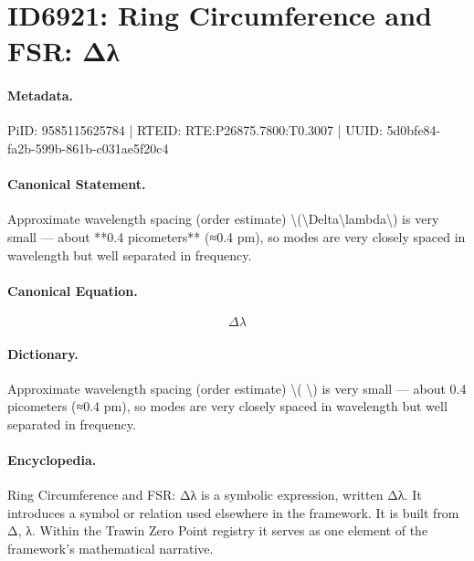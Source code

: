 \section*{ID6921: Ring Circumference and FSR: Δλ}
\paragraph{Metadata.}
PiID: 9585115625784 | RTEID: RTE:P26875.7800:T0.3007 | UUID: 5d0bfe84-fa2b-599b-861b-c031ae5f20c4

\paragraph{Canonical Statement.}
Approximate wavelength spacing (order estimate) \textbackslash{}(\textbackslash{}Delta\textbackslash{}lambda\textbackslash{}) is very small — about **0.4 picometers** (≈0.4 pm), so modes are very closely spaced in wavelength but well separated in frequency.

\paragraph{Canonical Equation.}
\[
\Delta\lambda
\]

\paragraph{Dictionary.}
Approximate wavelength spacing (order estimate) \textbackslash{}( \textbackslash{}) is very small — about 0.4 picometers (≈0.4 pm), so modes are very closely spaced in wavelength but well separated in frequency.

\paragraph{Encyclopedia.}
Ring Circumference and FSR: Δλ is a symbolic expression, written Δλ. It introduces a symbol or relation used elsewhere in the framework. It is built from Δ, λ. Within the Trawin Zero Point registry it serves as one element of the framework's mathematical narrative.
